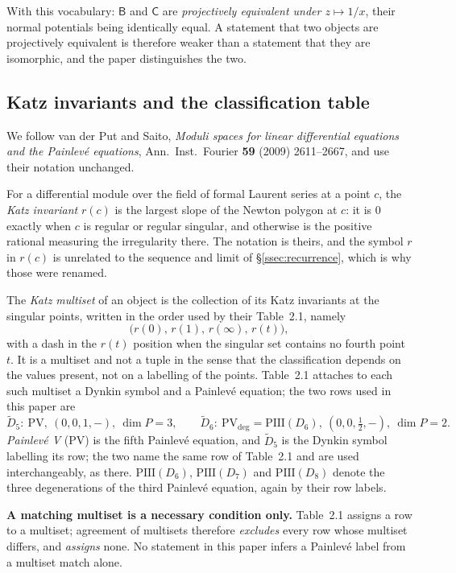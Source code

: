 With this vocabulary: $\mathsf B$ and $\mathsf C$ are \emph{projectively
equivalent under $z\mapsto1/x$}, their normal potentials being identically
equal. A statement that two objects are projectively equivalent is therefore
weaker than a statement that they are isomorphic, and the paper distinguishes
the two.

\subsection{Katz invariants and the classification table}\label{ssec:katz}

We follow van der Put and Saito, \emph{Moduli spaces for linear differential
equations and the Painlev\'e equations}, Ann.\ Inst.\ Fourier \textbf{59} (2009)
2611--2667, and use their notation unchanged.

For a differential module over the field of formal Laurent series at a point
$c$, the \emph{Katz invariant} $r(c)$ is the largest slope of the Newton
polygon at $c$: it is $0$ exactly when $c$ is regular or regular singular, and
otherwise is the positive rational measuring the irregularity there. The
notation is theirs, and the symbol $r$ in $r(c)$ is unrelated to the sequence
and limit of \S\ref{ssec:recurrence}, which is why those were renamed.

The \emph{Katz multiset} of an object is the collection of its Katz invariants
at the singular points, written in the order used by their Table~2.1, namely
\[
  \bigl(r(0),\,r(1),\,r(\infty),\,r(t)\bigr),
\]
with a dash in the $r(t)$ position when the singular set contains no fourth
point $t$. It is a multiset and not a tuple in the sense that the classification
depends on the values present, not on a labelling of the points. Table~2.1
attaches to each such multiset a Dynkin symbol and a Painlev\'e equation; the
two rows used in this paper are
\[
  \widetilde D_5:\ \mathrm{PV},\ (0,0,1,-),\ \dim P=3,
  \qquad
  \widetilde D_6:\ \mathrm{PV}_{\deg}=\mathrm{PIII}(D_6),\ (0,0,\tfrac12,-),\
  \dim P=2 .
\]
\emph{Painlev\'e V} (PV) is the fifth Painlev\'e equation, and $\widetilde D_5$
is the Dynkin symbol labelling its row; the two name the same row of Table~2.1
and are used interchangeably, as there. $\mathrm{PIII}(D_6)$, $\mathrm{PIII}(D_7)$
and $\mathrm{PIII}(D_8)$ denote the three degenerations of the third Painlev\'e
equation, again by their row labels.

\textbf{A matching multiset is a necessary condition only.} Table~2.1 assigns a
row to a multiset; agreement of multisets therefore \emph{excludes} every row
whose multiset differs, and \emph{assigns} none. No statement in this paper
infers a Painlev\'e label from a multiset match alone.

